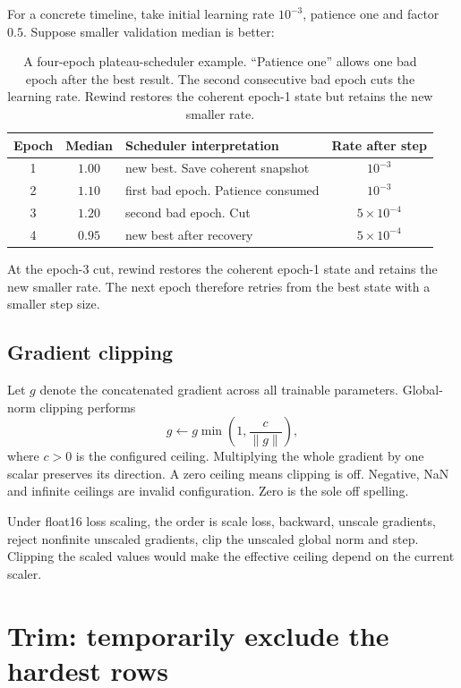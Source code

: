 \documentclass[10pt,aps,prd,twocolumn,nofootinbib]{revtex4-2}
\begin{document}
For a concrete timeline, take initial learning rate $10^{-3}$, patience one
and factor $0.5$.  Suppose smaller validation median is better:
\begin{table}[t]
\centering
\begin{tabular}{c@{\qquad}c@{\qquad}l@{\qquad}c}
\toprule
Epoch & Median & Scheduler interpretation & Rate after step \\
\midrule
1 & $1.00$ & new best.  Save coherent snapshot & $10^{-3}$ \\
2 & $1.10$ & first bad epoch.  Patience consumed & $10^{-3}$ \\
3 & $1.20$ & second bad epoch.  Cut & $5\times10^{-4}$ \\
4 & $0.95$ & new best after recovery & $5\times10^{-4}$ \\
\bottomrule
\end{tabular}
\caption{A four-epoch plateau-scheduler example.  ``Patience one'' allows one
bad epoch after the best result.  The second consecutive bad epoch cuts the
learning rate.  Rewind restores the coherent epoch-1 state but retains the
new smaller rate.}
\label{tab:plateau-timeline}
\end{table}
At the epoch-3 cut, rewind restores the coherent epoch-1 state and retains the
new smaller rate.  The next epoch therefore retries from the best state with a
smaller step size.

\subsection{Gradient clipping}

Let \(g\) denote the concatenated gradient across all trainable parameters.
Global-norm clipping performs
\begin{equation*}
 g\leftarrow g\min\left(1,\frac{c}{\lVert g\rVert}\right),
\end{equation*}
where \(c>0\) is the configured ceiling.  Multiplying the whole gradient by
one scalar preserves its direction.  A zero ceiling means clipping is off.
Negative, NaN and infinite ceilings are invalid configuration.  Zero is the
sole off spelling.

Under float16 loss scaling, the order is scale loss, backward, unscale
gradients, reject nonfinite unscaled gradients, clip the unscaled global norm
and step.  Clipping the scaled values would make the effective ceiling depend
on the current scaler.

\section{Trim: temporarily exclude the hardest rows}
\label{sec:trim}
\end{document}
